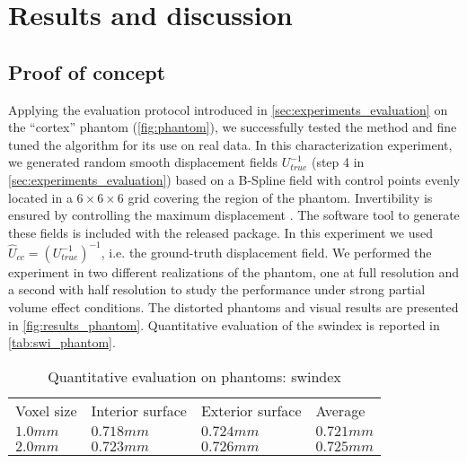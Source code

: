 \section{Results and discussion}
\label{sec:results}

\subsection{Proof of concept}
\label{sec:results_phantom}

Applying the evaluation protocol introduced in \autoref{sec:experiments_evaluation} on
  the ``cortex'' phantom (\autoref{fig:phantom}), we successfully tested the method and
  fine tuned the algorithm for its use on real data.
In this characterization experiment, we generated random smooth displacement fields $U^{-1}_{true}$
  (step 4 in \autoref{sec:experiments_evaluation}) based on a B-Spline field with
  control points evenly located in a $6 \times 6 \times 6$ grid covering the region of the phantom.
Invertibility is ensured by controlling the maximum	displacement
  \citep{rueckert_diffeomorphic_2006}.
The software tool to generate these fields is included with the released package.
In this experiment we used $\hat{U}_{cc} = (U^{-1}_{true})^{-1}$, i.e. the ground-truth
  displacement field.
We performed the experiment in two different realizations of the phantom, one at full resolution
  and a second with half resolution to study the performance under strong partial volume effect
  conditions.
The distorted phantoms and visual results are presented in \autoref{fig:results_phantom}.
Quantitative evaluation of the \gls*{swindex} is reported in \autoref{tab:swi_phantom}.

\begin{table}
	\caption{Quantitative evaluation on phantoms: \acrlong*{swindex}}
	\label{tab:swi_phantom}
    \begin{tabular}{llll}
    Voxel size  & Interior surface & Exterior surface & Average \\
    $1.0mm$ & $0.718mm$            & $0.724mm$            & $0.721mm$   \\
    $2.0mm$ & $0.723mm$            & $0.726mm$            & $0.725mm$   \\
    \end{tabular}
\end{table}

